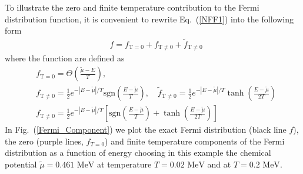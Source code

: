 \documentclass[sn-mathphys,Numbered]{sn-jnl}
\newcommand*{\MeV}{\text{ MeV}}
\begin{document}
To illustrate the zero and finite temperature contribution to the Fermi distribution function, it is convenient to rewrite Eq.~(\ref{NFF1}) into the following form
\begin{align}\label{Eq_form}
&f=f_{\mathrm{T=0}}+f_\mathrm{T\neq0}+\tilde f_\mathrm{T\neq0}
\end{align}
where the function are defined as
\begin{align}
&f_{\mathrm{T=0}}=\Theta\left(\frac{\widetilde\mu - E}{T}\right),\\ &f_\mathrm{T\neq0}=\frac{1}{2}e^{ - |E-\widetilde\mu|/T }\mathrm{sgn}\left(\frac{E-\widetilde\mu}{T}\right),\quad\tilde f_\mathrm{T\neq0}=\frac{1}{2}e^{ - |E-\widetilde\mu|/T }\tanh\left(\frac{E-\widetilde\mu}{2T}\right)\\
&f_\mathrm{T\neq0}=\frac{1}{2}e^{ - |E-\widetilde\mu|/T }\left[\mathrm{sgn}\left(\frac{E-\widetilde\mu}{T}\right)+\tanh\left(\frac{E-\widetilde\mu}{2T}\right)\right]
\end{align}
In Fig.~(\ref{Fermi_Component}) we plot the exact Fermi distribution (black line $f$), the zero (purple lines, $f_{T=0}$) and finite temperature components of the Fermi distribution as a function of energy choosing in this example the chemical potential $\widetilde\mu=0.461\MeV$ at temperature $T=0.02\MeV$ and at $T=0.2\MeV$.
\end{document}
